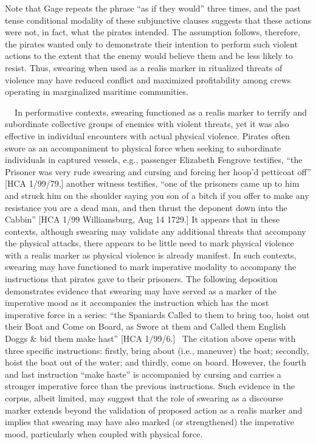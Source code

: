 \begin{styleStandard}
Note that Gage repeats the phrase “as if they would” three times, and the past tense conditional modality of these subjunctive clauses suggests that these actions were not, in fact, what the pirates intended. The assumption follows, therefore, the pirates wanted only to demonstrate their intention to perform such violent actions to the extent that the enemy would believe them and be less likely to resist. Thus, swearing when used as a realis marker in ritualized threats of violence may have reduced conflict and maximized profitability among crews operating in marginalized maritime communities. 
\end{styleStandard}

\begin{styleStandard}
\textbf{\ \ }In performative contexts, swearing functioned as a realis marker to terrify and subordinate collective groups of enemies with violent threats, yet it was also effective in individual encounters with actual physical violence. Pirates often swore as an accompaniment to physical force when seeking to subordinate individuals in captured vessels, e.g., passenger Elizabeth Fengrove testifies, “the Prisoner was very rude swearing and cursing and forcing her hoop’d petticoat off” [HCA 1/99/79,] another witness testifies, “one of the prisoners came up to him and struck him on the shoulder saying you son of a bitch if you offer to make any resistance you are a dead man, and then thrust the deponent down into the Cabbin” [HCA 1/99 Williamsburg, Aug 14 1729.] It appears that in these contexts, although swearing may validate any additional threats that accompany the physical attacks, there appears to be little need to mark physical violence with a realis marker as physical violence is already manifest. In such contexts, swearing may have functioned to mark imperative modality to accompany the instructions that pirates gave to their prisoners. The following deposition demonstrates evidence that swearing may have served as a marker of the imperative mood as it accompanies the instruction which has the most imperative force in a series: “the Spaniards Called to them to bring too, hoist out their Boat and Come on Board, as Swore at them and Called them English Doggs \& bid them make hast” [HCA 1/99/6.] ~The citation above opens with three specific instructions: firstly, bring about (i.e., maneuver) the boat; secondly, hoist the boat out of the water; and thirdly, come on board. However, the fourth and last instruction “make haste” is accompanied by cursing and carries a stronger imperative force than the previous instructions. Such evidence in the corpus, albeit limited, may suggest that the role of swearing as a discourse marker extends beyond the validation of proposed action as a realis marker and implies that swearing may have also marked (or strengthened) the imperative mood, particularly when coupled with physical force. 
\end{styleStandard}

